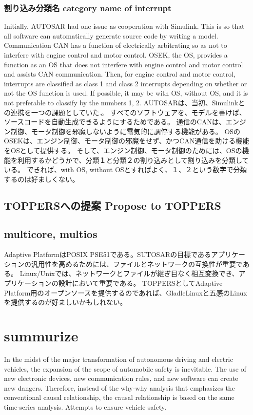 \documentclass[twocolumn]{article} %
\begin{document}
\subsubsection{割り込み分類名 category name of interrupt}
Initially, AUTOSAR had one issue as cooperation with Simulink\cite{simulink}.
This is so that all software can automatically generate source code by writing a model.
Communication CAN has a function of electrically arbitrating so as not to interfere with engine control and motor control.
OSEK, the OS, provides a function as an OS that does not interfere with engine control and motor control and assists CAN communication.
Then, for engine control and motor control, interrupts are classified as class 1 and class 2 interrupts depending on whether or not the OS function is used.
If possible, it may be with OS, without OS, and it is not preferable to classify by the numbers 1, 2.
AUTOSARは、当初、Simulinkとの連携を一つの課題としていた\cite{simulink}.。
すべてのソフトウェアを、モデルを書けば、ソースコードを自動生成できるようにするためである。
通信のCANは、エンジン制御、モータ制御を邪魔しないように電気的に調停する機能がある。
OSのOSEKは、エンジン制御、モータ制御の邪魔をせず、かつCAN通信を助ける機能をOSとして提供する。
そして、エンジン制御、モータ制御のためには、OSの機能を利用するかどうかで、分類１と分類２の割り込みとして割り込みを分類している。
できれば、with OS, without OSとすればよく、１、２という数字で分類するのは好ましくない。
\subsection{TOPPERSへの提案 Propose to TOPPERS}
\subsection{multicore, multios}
Adaptive PlatformはPOSIX PSE51である。SUTOSARの目標であるアプリケーションの汎用性を高めるためには、ファイルとネットワークの互換性が重要である。
Linux/Unixでは、ネットワークとファイルが継ぎ目なく相互変換でき、アプリケーションの設計において重要である。
TOPPERSとしてAdaptive Platform用のオープンソースを提供するのであれば、GladleLinuxと五感のLinuxを提供するのが好ましいかもしれない。



\section{summurize}
In the midst of the major transformation of autonomous driving and electric vehicles, the expansion of the scope of automobile safety is inevitable.
The use of new electronic devices, new communication rules, and new software can create new dangers.
Therefore, instead of the why-why analysis that emphasizes the conventional causal relationship, the causal relationship is based on the same time-series analysis.
Attempts to ensure vehicle safety.
\end{document}

